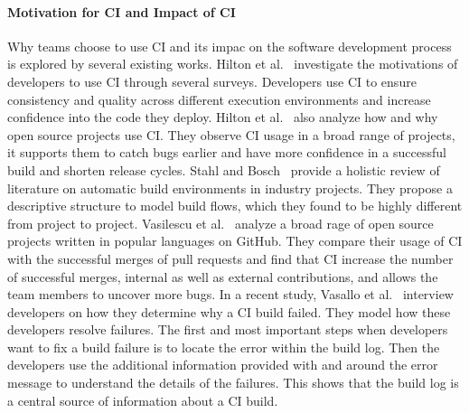 \documentclass[\myrootdir/main.tex]{subfiles}
\begin{document}
\paragraph{Motivation for CI and Impact of CI}
Why teams choose to use CI and its impac on the software development process is explored by several existing works.
Hilton et al.~\cite{hilton2017trade-offs} investigate the motivations of developers to use CI through several surveys.
Developers use CI to ensure consistency and quality across different execution environments and increase confidence into the code they deploy.
Hilton et al.~\cite{hilton2016usage} also analyze how and why open source projects use CI\@.
They observe CI usage in a broad range of projects, it supports them to catch bugs earlier and have more confidence in a successful build and shorten release cycles.
Stahl and Bosch~\cite{staahl2014modeling} provide a holistic review of literature on automatic build environments in industry projects.
They propose a descriptive structure to model build flows, which they found to be highly different from project to project.
Vasilescu et al.~\cite{vasilescu2015quality} analyze a broad rage of open source projects written in popular languages on GitHub.
They compare their usage of CI with the successful merges of pull requests and find that CI increase the number of successful merges, internal as well as external contributions, and allows the team members to uncover more bugs.
In a recent study, Vasallo et al.~\cite{vassallo2019every} interview developers on how they determine why a CI build failed.
They model how these developers resolve failures.
The first and most important steps when developers want to fix a build failure is to locate the error within the build log.
Then the developers use the additional information provided with and around the error message to understand the details of the failures.
This shows that the build log is a central source of information about a CI build.
\end{document}
